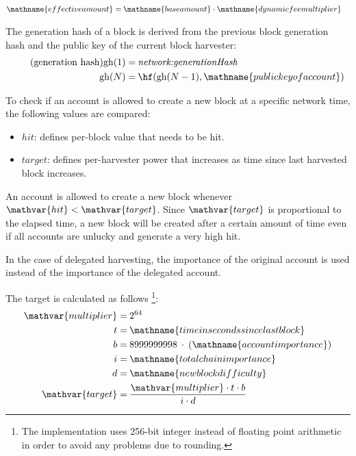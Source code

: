\begin{align*}
	\mathname{effective amount} = \: & \mathname{base amount} \cdot \mathname{dynamic fee multiplier}
\end{align*}


The generation hash of a block is derived from the previous block generation hash and the public key of the current block harvester:
\begin{align*}
	\tag{generation hash}
	\mathfunc{gh}(1) = \: & \nemsetting{network}{generationHash} \\
	\mathfunc{gh}(N) = \: & \hf(\mathfunc{gh}(N - 1), \mathname{public key of account})
\end{align*}

To check if an account is allowed to create a new block at a specific network time, the following values are compared:
\begin{itemize}
	\item{$hit$: defines per-block value that needs to be hit.}
	\item{$target$: defines per-harvester power that increases as time since last harvested block increases.}
\end{itemize}

An account is allowed to create a new block whenever $\mathvar{hit} < \mathvar{target}$.
Since $\mathvar{target}$ is proportional to the elapsed time, a new block will be created after a certain amount of time even if all accounts are unlucky and generate a very high hit.

In the case of delegated harvesting, the importance of the original account is used instead of the importance of the delegated account.

The target is calculated as follows
\footnote{The implementation uses 256-bit integer instead of floating point arithmetic in order to avoid any problems due to rounding.}:
\begin{align*}
	\mathvar{multiplier} = \: & 2^{64} \\
	t = \: & \mathname{time in seconds since last block} \\
	b = \: & 8999999998 \: \cdot \: (\mathname{account importance}) \\
	i = \: & \mathname{total chain importance} \\
	d = \: & \mathname{new block difficulty} \\
	\mathvar{target} = \: & \frac{\mathvar{multiplier} \cdot t \cdot b}{i \cdot d}
\end{align*}

